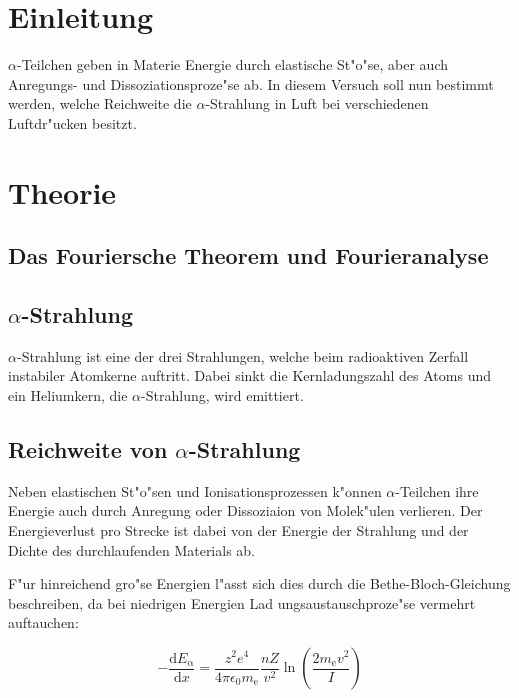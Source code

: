 \section{Einleitung} %
\label{sec:einleitung}
	
	$\alpha$-Teilchen geben in Materie Energie durch elastische St"o"se, aber auch Anregungs- und Dissoziationsproze"se ab. In diesem Versuch soll nun bestimmt werden, welche Reichweite die $\alpha$-Strahlung in Luft bei verschiedenen Luftdr"ucken besitzt.
	
\section{Theorie} %
\label{sec:theorie}
	\subsection{Das Fouriersche Theorem und Fourieranalyse}
	\label{subsec:fourier}

\subsection{$\alpha$-Strahlung} %
\label{sub:_alpha_strahlung}

$\alpha$-Strahlung ist eine der drei Strahlungen, welche beim radioaktiven Zerfall instabiler Atomkerne auftritt.
Dabei sinkt die Kernladungszahl des Atoms und ein Heliumkern, die $\alpha$-Strahlung, wird emittiert.

\subsection{Reichweite von $\alpha$-Strahlung} %
\label{sub:reichweite_von_alpha_strahlung}

Neben elastischen St"o"sen und Ionisationsprozessen k"onnen $\alpha$-Teilchen ihre Energie auch durch Anregung oder Dissoziaion von Molek"ulen verlieren. Der Energieverlust pro Strecke ist dabei von der Energie der Strahlung und der Dichte des durchlaufenden Materials ab.

F"ur hinreichend gro"se Energien l"asst sich dies durch die Bethe-Bloch-Gleichung beschreiben, da bei niedrigen Energien Lad
ungsaustauschproze"se vermehrt auftauchen:

\begin{equation}
	-\frac{\mathrm{d}E_\mathrm{\alpha}}{\mathrm{d}x} = \frac{z^2e^4}{4\pi \epsilon_\mathrm{0} m_\mathrm{e}} \frac{n Z}{v^2} \ln \left( \frac{2 m_\mathrm{e}v^2}{I} \right)
\end{equation}

